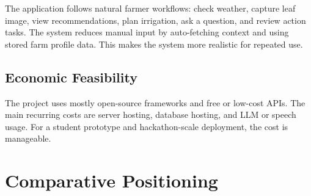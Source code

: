 \documentclass[12pt,a4paper]{report}
\begin{document}
The application follows natural farmer workflows: check weather, capture leaf image, view recommendations, plan irrigation, ask a question, and review action tasks. The system reduces manual input by auto-fetching context and using stored farm profile data. This makes the system more realistic for repeated use.

\subsection{Economic Feasibility}

The project uses mostly open-source frameworks and free or low-cost APIs. The main recurring costs are server hosting, database hosting, and LLM or speech usage. For a student prototype and hackathon-scale deployment, the cost is manageable.

\section{Comparative Positioning}

\begin{table}[H]
\centering
\caption{Comparison with Typical Agricultural Tools}
\label{tab:comparison}
\scriptsize
{}
\end{table}
\end{document}
